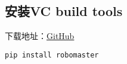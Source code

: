 
\subsection{安装VC build tools}
下载地址：\href{https://github.com/dji-sdk/robomaster-sdk}{GitHub}
\begin{lstlisting}[language=pythonC]
pip install robomaster
\end{lstlisting}